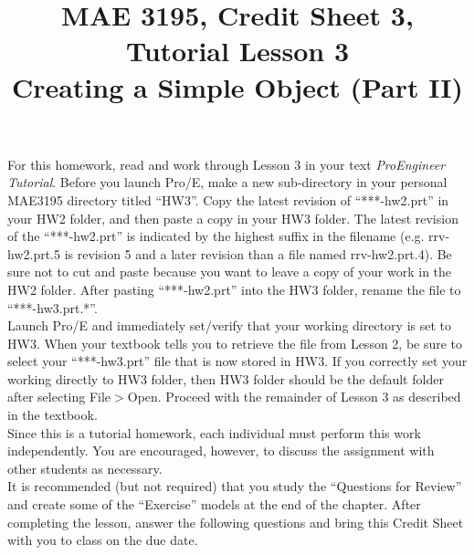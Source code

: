 \documentclass[12pt]{article}
\title{MAE 3195, Credit Sheet 3, Tutorial Lesson 3\\
Creating a Simple Object (Part II)}
\date{}
\begin{document}
\maketitle

For this homework, read and work through Lesson 3 in your text \textit{ProEngineer Tutorial}. Before you launch Pro/E, make a new sub-directory in your personal MAE3195 directory titled ``HW3''. Copy the latest revision of ``***-hw2.prt'' in your HW2 folder, and then paste a copy in your HW3 folder. The latest revision of the ``***-hw2.prt'' is indicated by the highest suffix in the filename (e.g. rrv-hw2.prt.5 is revision 5 and a later revision than a file named rrv-hw2.prt.4). Be sure not to cut and paste because you want to leave a copy of your work in the HW2 folder. After pasting ``***-hw2.prt'' into the HW3 folder, rename the file to ``***-hw3.prt.*''.\\

Launch Pro/E and immediately set/verify that your working directory is set to HW3. When your textbook tells you to retrieve the file from Lesson 2, be sure to select your ``***-hw3.prt'' file that is now stored in HW3. If you correctly set your working directly to HW3 folder, then HW3 folder should be the default folder after selecting File$>$Open. Proceed with the remainder of Lesson 3 as described in the textbook.\\

Since this is a tutorial homework, each individual must perform this work independently. You are encouraged, however, to discuss the assignment with other students as necessary.\\

It is recommended (but not required) that you study the ``Questions for Review'' and create some of the ``Exercise'' models at the end of the chapter. After completing the lesson, answer the following questions and bring this Credit Sheet with you to class on the due date.
\end{document}
